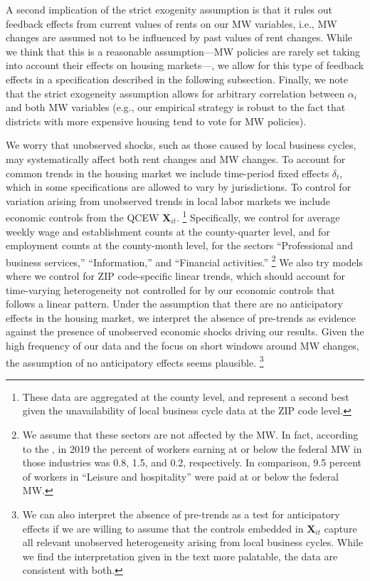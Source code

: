 A second implication of the strict exogenity assumption is that it rules out 
feedback effects from current values of rents on our MW variables, 
i.e., MW changes are assumed not to be influenced by past values of rent changes.
While we think that this is a reasonable assumption---MW policies are rarely 
set taking into account their effects on housing markets---, we allow for this 
type of feedback effects in a specification described in the following subsection.
Finally, we note that the strict exogeneity assumption allows for arbitrary 
correlation between $\alpha_i$ and both MW variables 
(e.g., our empirical strategy is robust to the fact that districts with more
expensive housing tend to vote for MW policies).

We worry that unobserved shocks, such as those caused by local business cycles, 
may systematically affect both rent changes and MW changes.
To account for common trends in the housing market we include time-period 
fixed effects $\delta_t$, which in some specifications are allowed to vary by 
jurisdictions.
To control for variation arising from unobserved trends in local labor markets 
we include economic controls from the QCEW $\mathbf{X}_{it}$.%
\footnote{These data are aggregated at the county level, and represent a second 
best given the unavailability of local business cycle data at the ZIP code 
level.}
Specifically, we control for average weekly wage and establishment counts at the 
county-quarter level, and for employment counts at the county-month level, 
for the sectors ``Professional and business services,'' ``Information,'' and 
``Financial activities.''%
\footnote{We assume that these sectors are not affected by the MW.
In fact, according to the \textcite[][Table 5]{MinWorkersReportBLS}, in 
2019 the percent of workers earning at or below the federal MW in those 
industries was 0.8, 1.5, and 0.2, respectively.
In comparison, 9.5 percent of workers in ``Leisure and hospitality'' were paid 
at or below the federal MW.}
We also try models where we control for ZIP code-specific linear
trends, which should account for time-varying heterogeneity not controlled for 
by our economic controls that follows a linear pattern.
Under the assumption that there are no anticipatory effects in the housing 
market, we interpret the absence of pre-trends as evidence against the presence 
of unobserved economic shocks driving our results.
Given the high frequency of our data and the focus on short windows around 
MW changes, the assumption of no anticipatory effects seems plausible.%
\footnote{We can also interpret the absence of pre-trends as a test for 
anticipatory effects if we are willing to assume that the controls embedded in 
$\mathbf{X}_{it}$ capture all relevant unobserved heterogeneity arising from 
local business cycles.
While we find the interpretation given in the text more palatable, the data are 
consistent with both.}
